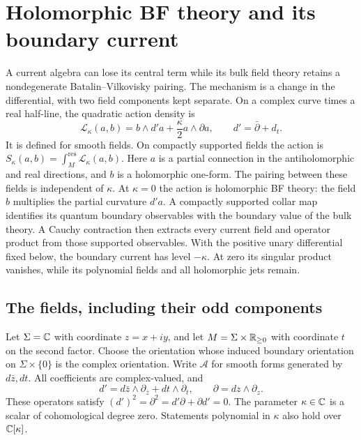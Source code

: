 \chapter{Holomorphic BF theory and its boundary current}
\label{chap:zero-level-bf}

A current algebra can lose its central term while its bulk field theory
retains a nondegenerate Batalin--Vilkovisky pairing.  The mechanism is a
change in the differential, with two field components kept separate.
On a complex curve times a real half-line, the quadratic action density is
\[
 \mathcal L_\kappa(a,b)
 =b\wedge d'a+\frac\kappa2a\wedge\partial a,
 \qquad d'=\bar\partial+d_t.
\]
It is defined for smooth fields.  On compactly supported fields the
action is $S_\kappa(a,b)=\int_M^{\mathrm{res}}\mathcal L_\kappa(a,b)$.
Here $a$ is a partial connection in the antiholomorphic and real
directions, and $b$ is a holomorphic one-form.  The pairing between
these fields is independent of $\kappa$.  At $\kappa=0$ the action is
holomorphic BF theory: the field $b$ multiplies the partial curvature
$d'a$.  A compactly supported collar map identifies its quantum
boundary observables with the boundary value of the bulk theory.
A Cauchy contraction then extracts every current field and operator
product from those supported observables.  With the positive unary
differential fixed below, the boundary current has level $-\kappa$.
At zero its singular product vanishes, while its polynomial fields
and all holomorphic jets remain.

\section{The fields, including their odd components}

Let $\Sigma=\mathbb C$ with coordinate $z=x+iy$, and let
$M=\Sigma\times\mathbb R_{\ge0}$ with coordinate $t$ on the second factor.
Choose the orientation whose induced boundary orientation on
$\Sigma\times\{0\}$ is the complex orientation.
Write $\mathcal A$ for smooth forms generated by $d\bar z,dt$.
All coefficients are complex-valued, and
\[
 d'=d\bar z\wedge\partial_{\bar z}+dt\wedge\partial_t,
 \qquad \partial=dz\wedge\partial_z.
\]
These operators satisfy $(d')^2=\partial^2=d'\partial+\partial d'=0$.
The parameter $\kappa\in\mathbb C$ is a scalar of cohomological degree zero.
Statements polynomial in $\kappa$ also hold over $\mathbb C[\kappa]$.

